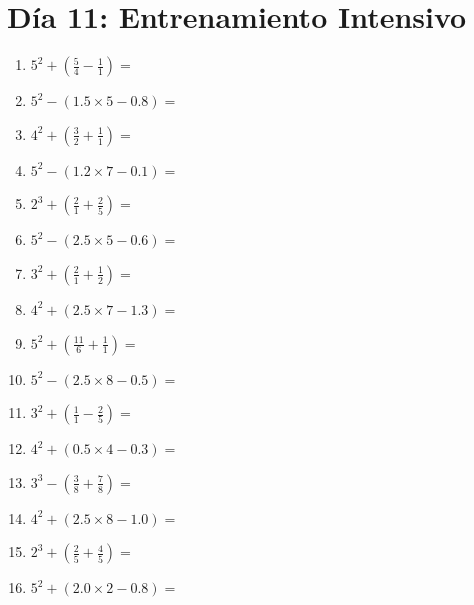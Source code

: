 \documentclass[12pt]{article}
\begin{document}
\section*{Día 11: Entrenamiento Intensivo}
\begin{enumerate}
\item \large $ 5^{2} + (\frac{5}{4} - \frac{1}{1}) = $ \vspace{1.6cm}
\item \large $ 5^{2} - (1.5 \times 5 - 0.8) = $ \vspace{1.6cm}
\item \large $ 4^{2} + (\frac{3}{2} + \frac{1}{1}) = $ \vspace{1.6cm}
\item \large $ 5^{2} - (1.2 \times 7 - 0.1) = $ \vspace{1.6cm}
\item \large $ 2^{3} + (\frac{2}{1} + \frac{2}{5}) = $ \vspace{1.6cm}
\item \large $ 5^{2} - (2.5 \times 5 - 0.6) = $ \vspace{1.6cm}
\item \large $ 3^{2} + (\frac{2}{1} + \frac{1}{2}) = $ \vspace{1.6cm}
\item \large $ 4^{2} + (2.5 \times 7 - 1.3) = $ \vspace{1.6cm}
\item \large $ 5^{2} + (\frac{11}{6} + \frac{1}{1}) = $ \vspace{1.6cm}
\item \large $ 5^{2} - (2.5 \times 8 - 0.5) = $ \vspace{1.6cm}
\newpage
\item \large $ 3^{2} + (\frac{1}{1} - \frac{2}{5}) = $ \vspace{1.6cm}
\item \large $ 4^{2} + (0.5 \times 4 - 0.3) = $ \vspace{1.6cm}
\item \large $ 3^{3} - (\frac{3}{8} + \frac{7}{8}) = $ \vspace{1.6cm}
\item \large $ 4^{2} + (2.5 \times 8 - 1.0) = $ \vspace{1.6cm}
\item \large $ 2^{3} + (\frac{2}{5} + \frac{4}{5}) = $ \vspace{1.6cm}
\item \large $ 5^{2} + (2.0 \times 2 - 0.8) = $ \vspace{1.6cm}

\end{enumerate}
\end{document}
